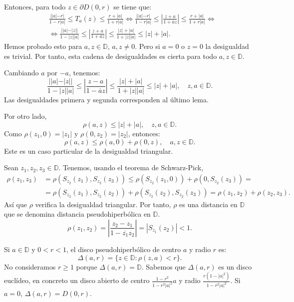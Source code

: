 Entonces, para todo $z \in \partial D(0, r)$ se tiene que:
\begin{align*}
     & \frac{||a|-r|}{1-r|a|} \leq T_a(z) \leq \frac{r+|a|}{1+r|a|} \Leftrightarrow \frac{||a|-r|}{1-r|a|} \leq \left|\frac{z+a}{1+\overline{a}z}\right| \leq \frac{r+|a|}{1+r|a|} \Leftrightarrow \\
     & \Leftrightarrow \frac{||a|-|z||}{1-|z||a|} \leq \left|\frac{z+a}{1+\overline{a}z}\right| \leq \frac{|z|+|a|}{1+|z||a|} \leq |z|+|a|.
\end{align*}
Hemos probado esto para $a, z \in \mathbb{D}$, $a, z \neq 0$.
Pero si $a = 0$ o $z = 0$ la desigualdad es trivial.
Por tanto, esta cadena de desigualdades es cierta para todo $a, z \in \mathbb{D}$.

Cambiando $a$ por $-a$, tenemos:
$$\frac{||a|-|z||}{1-|z||a|} \leq \left|\frac{z-a}{1-\overline{a}z}\right| \leq \frac{|z|+|a|}{1+|z||a|} \leq |z|+|a|, \quad z, a \in \mathbb{D}.$$
Las desigualdades primera y segunda corresponden al último lema.

Por otro lado,
$$\rho(a, z) \leq |z| + |a|, \quad z, a \in \mathbb{D}.$$
Como $\rho(z_1, 0) = |z_1|$ y $\rho(0, z_2) = |z_2|$, entonces:
$$\rho(a, z) \leq \rho(a, 0) + \rho(0, z), \quad a, z \in \mathbb{D}.$$
Este es un caso particular de la desigualdad triangular.

Sean $z_1, z_2, z_3 \in \mathbb{D}$.
Tenemos, usando el teorema de Schwarz-Pick,
\begin{align*}
    \rho(z_1, z_3) & = \rho(S_{z_2}(z_1), S_{z_2}(z_3)) \leq \rho(S_{z_2}(z_1, 0)) + \rho(0, S_{z_2}(z_3)) =                  \\
                   & = \rho(S_{z_2}(z_1), S_{z_2}(z_2)) + \rho(S_{z_2}(z_2), S_{z_2}(z_3)) = \rho(z_1, z_2) + \rho(z_2, z_3).
\end{align*}
Así que $\rho$ verifica la desigualdad triangular.
Por tanto, $\rho$ es una distancia en $\mathbb{D}$ que se denomina distancia pseudohiperbólica en $\mathbb{D}$.
$$\rho(z_1, z_2) = \left|\frac{z_2-z_1}{1-\overline{z_1}z_2}\right| = |S_{z_1}(z_2)| < 1.$$

Si $a \in \mathbb{D}$ y $0 < r < 1$, el disco pseudohiperbólico de centro $a$ y radio $r$ es:
$$\Delta(a, r) = \{z \in \mathbb{D} : \rho(z, a) < r\}.$$
No consideramos $r \geq 1$ porque $\Delta(a, r) = \mathbb{D}$.
Sabemos que $\Delta(a, r)$ es un disco euclídeo, en concreto un disco abierto de centro $\frac{1-r^2}{1-r^2|a|^2}a$ y radio $\frac{r(1-|a|^2)}{1-r^2|a|^2}$.
Si $a = 0$, $\Delta(a, r) = D(0, r)$.

